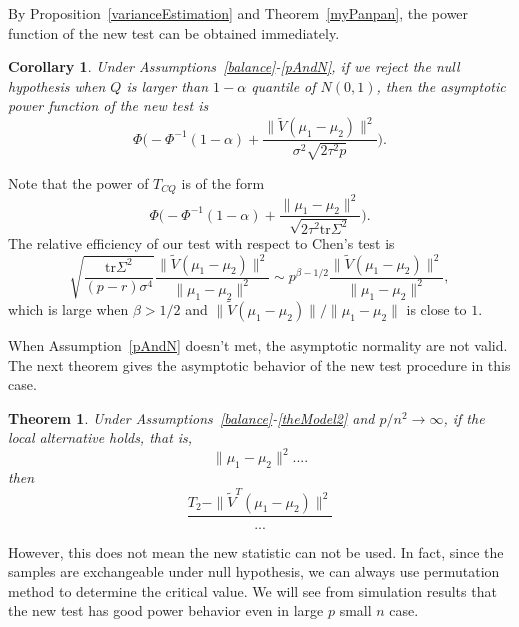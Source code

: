 \documentclass[review]{elsarticle}
\theoremstyle{plain}
\newtheorem{theorem}{\quad\quad Theorem}
\newtheorem{corollary}{\quad\quad Corollary}
\theoremstyle{definition}
\newtheorem{remark}{\quad\quad Remark}
\theoremstyle{remark}
\begin{document}

By Proposition~\ref{varianceEstimation}  and Theorem~\ref{myPanpan}, the power function of the new test can be obtained immediately.


\begin{corollary}\label{testPowerh}
    Under Assumptions~\ref{balance}-\ref{pAndN},
    if we reject the null hypothesis when $Q$ is larger than $1-\alpha$ quantile of $N(0,1)$, then the asymptotic power function of the new test is
    \begin{equation*}
        \Phi\Big(-\Phi^{-1}(1-\alpha)+\frac{\|\tilde{V}(\mu_1-\mu_2)\|^2}{\sigma^2\sqrt{2\tau^2p}}\Big).
    \end{equation*}
\end{corollary}


 Note that the power of $T_{CQ}$ is of the form
\begin{equation*}
    \Phi\Big(-\Phi^{-1}(1-\alpha)+\frac{\|\mu_1-\mu_2\|^2}{\sqrt{2\tau^2\mathrm{tr}\Sigma^2}}\Big).
\end{equation*}
 The relative efficiency of our test with respect to Chen's test is
\begin{equation*}
    \sqrt{\frac{\mathrm{tr}\Sigma^2}{(p-r)\sigma^4}}\frac{\|\tilde{V}(\mu_1-\mu_2)\|^2}{\|\mu_1-\mu_2\|^2}\sim p^{\beta-1/2}\frac{\|\tilde{V}(\mu_1-\mu_2)\|^2}{\|\mu_1-\mu_2\|^2},
\end{equation*}
which is large when $\beta>1/2$ and $\|\tilde{V}(\mu_1-\mu_2)\|/\|\mu_1-\mu_2\|$ is close to $1$.


When Assumption~\ref{pAndN} doesn't met, the asymptotic normality are not valid.
The next theorem gives the asymptotic behavior of the new test procedure in this case.
\begin{theorem}
    Under Assumptions~\ref{balance}-\ref{theModel2} and $p/n^2\to \infty$,
if the local alternative holds, that is,
    $$\|\mu_1-\mu_2\|^2....$$
then 
\begin{equation*}
    \frac{T_2-\|\tilde{V}^T(\mu_1-\mu_2)\|^2}{...}
\end{equation*}
\end{theorem}
However, this does not mean the new statistic can not be used.
In fact, since the samples are exchangeable under null hypothesis, we can always use permutation method to determine the critical value.
We will see from simulation results that the new test has good power behavior even in large $p$ small $n$ case.
\end{document}
